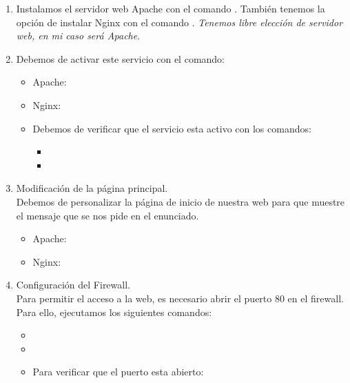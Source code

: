 \begin{enumerate}
\item Instalamos el servidor web Apache con el comando . También tenemos la opción de instalar Nginx con el comando . \textit{Tenemos libre elección de servidor web, en mi caso será Apache}.
\item Debemos de activar este servicio con el comando:
  \begin{itemize}
    \item Apache: 
    \item Nginx: 
    \item Debemos de verificar que el servicio esta activo con los comandos:
    \begin{itemize}
      \item {}
      \item {}
    \end{itemize}
  \end{itemize}
  \item Modificación de la página principal.\\
  Debemos de personalizar la página de inicio de nuestra web para que muestre el mensaje que se nos pide en el enunciado.
  \begin{itemize}
    \item Apache: 
    \item Nginx: 
  \end{itemize}
  \item Configuración del Firewall.\\
  Para permitir el acceso a la web, es necesario abrir el puerto 80 en el firewall. Para ello, ejecutamos los siguientes comandos:
  \begin{itemize}
    \item {}
    \item {}
    \item Para verificar que el puerto esta abierto: 
  \end{itemize}

\end{enumerate}
